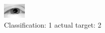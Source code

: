 \begin{figure}[h!]
\begin{center}
\includegraphics[width=0.60\columnwidth]{figures/ID2328_class_1_target_2.png}
\end{center}
\caption{ Classification: 1 actual target: 2}
\label{fig:ID2328_class_1_target_2}
\end{figure}
